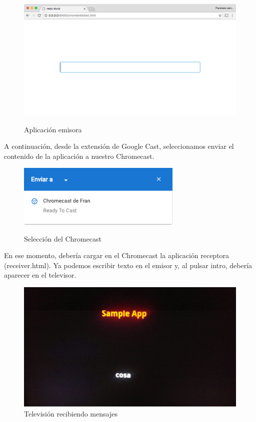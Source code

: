 \begin{figure}[H]
	\centering
	\includegraphics[width=1.1\textwidth]{./Imagenes/emisor1.png}
	\label{fig:fondo}
	\caption{Aplicación emisora}
\end{figure}

A continuación, desde la extensión de Google Cast, seleccionamos enviar el contenido de la aplicación a nuestro Chromecast.

\begin{figure}[H]
	\centering
	\includegraphics[width=0.7\textwidth]{./Imagenes/seleccion.png}
	\label{fig:fondo}
	\caption{Selección del Chromecast}
\end{figure}


En ese momento, debería cargar en el Chromecast la aplicación receptora (receiver.html).
Ya podemos escribir texto en el emisor y, al pulsar intro, debería aparecer en el televisor.


\begin{figure}[H]
	\centering
	\includegraphics[width=1\textwidth]{./Imagenes/receptor.jpg}
	\caption{Televisión recibiendo mensajes}
\end{figure}
	
